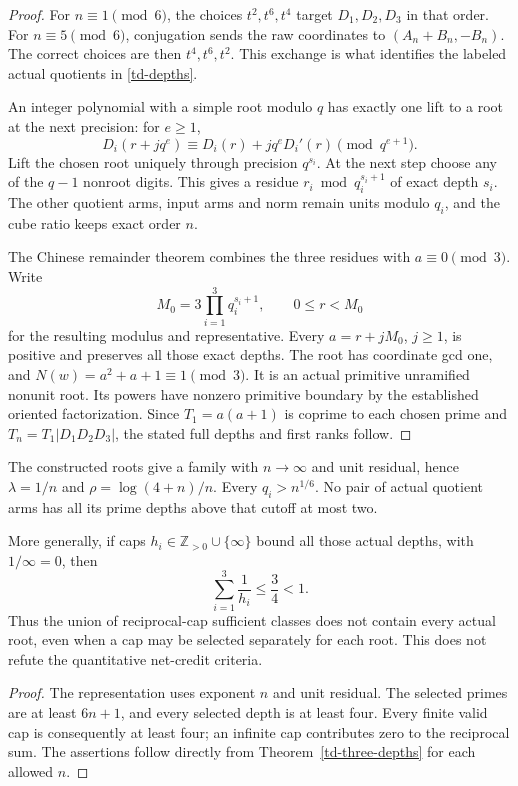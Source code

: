 \begin{proof}
For $n\equiv1\pmod6$, the choices $t^2,t^6,t^4$ target
$D_1,D_2,D_3$ in that order. For $n\equiv5\pmod6$, conjugation
sends the raw coordinates to $(A_n+B_n,-B_n)$. The correct choices
are then $t^4,t^6,t^2$. This exchange is what identifies the
labeled actual quotients in \eqref{td-depths}.

An integer polynomial with a simple root modulo $q$ has exactly one
lift to a root at the next precision: for $e\ge1$,
\[
 D_i(r+jq^e)\equiv D_i(r)+jq^eD_i'(r)\pmod{q^{e+1}}.
\]
Lift the chosen root uniquely through precision $q^{s_i}$. At the
next step choose any of the $q-1$ nonroot digits. This gives a residue
$r_i\bmod q_i^{s_i+1}$ of exact depth $s_i$. The other quotient
arms, input arms and norm remain units modulo $q_i$, and the cube
ratio keeps exact order $n$.

The Chinese remainder theorem combines the three residues with
$a\equiv0\pmod3$. Write
\begin{equation}\label{td-crt-modulus}
 M_0=3\prod_{i=1}^3q_i^{s_i+1},\qquad 0\le r<M_0
\end{equation}
for the resulting modulus and representative. Every $a=r+jM_0$,
$j\ge1$, is positive and preserves all those exact depths.
The root has coordinate gcd one, and $N(w)=a^2+a+1\equiv1\pmod3$.
It is an actual primitive unramified nonunit root. Its powers have
nonzero primitive boundary by the established oriented factorization.
Since $T_1=a(a+1)$ is coprime to each chosen prime and
$T_n=T_1|D_1D_2D_3|$, the stated full depths and first ranks follow.
\end{proof}

\begin{corollary}
\label{td-cap-boundary}
The constructed roots give a family with $n\to\infty$ and unit
residual, hence $\lambda=1/n$ and $\rho=\log(4+n)/n$.
Every $q_i>n^{1/6}$. No pair of actual quotient arms has all its
prime depths above that cutoff at most two.

More generally, if caps $h_i\in\mathbb Z_{>0}\cup\{\infty\}$
bound all those actual depths, with $1/\infty=0$, then
\[
 \sum_{i=1}^3\frac1{h_i}\le\frac34<1.
\]
Thus the union of reciprocal-cap sufficient classes does not contain
every actual root, even when a cap may be selected separately for
each root. This does not refute the quantitative net-credit criteria.
\end{corollary}
\begin{proof}
The representation uses exponent $n$ and unit residual. The selected
primes are at least $6n+1$, and every selected depth is at least four.
Every finite valid cap is consequently at least four; an infinite
cap contributes zero to the reciprocal sum. The assertions follow
directly from Theorem~\ref{td-three-depths} for each allowed $n$.
\end{proof}

